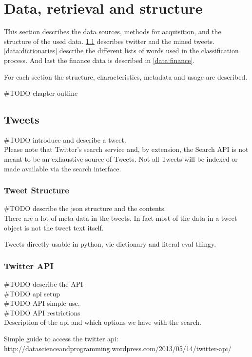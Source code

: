 \chapter{Data, retrieval and structure}

This section describes the data sources, methods for acquisition, and the
structure of the used data. \ref{data:tweets} describes twitter and the mined
tweets. \ref{data:dictionaries} describe the different lists of words used in
the classification process. And last the finance data is described in
\ref{data:finance}.

For each section the structure, characteristics, metadata and usage are
described. 

#TODO chapter outline
%

\section{Tweets}\label{data:tweets}
#TODO introduce and describe a tweet. \\
Please note that Twitter's search service and, by extension, the Search API is
not meant to be an exhaustive source of Tweets. Not all Tweets will be indexed
or made available via the search interface. 
%

\subsection{Tweet Structure}
#TODO describe the json structure and the contents.\\
There are a lot of meta data in the tweets. In fact most of the data in a tweet
object is not the tweet text itself.

Tweets directly usable in python, vie dictionary and literal eval thingy. 
%

\subsection{Twitter API}
#TODO describe the API\\
#TODO api setup\\
#TODO API simple use.\\
#TODO API restrictions\\

Description of the api and which options we have with the search. 

Simple guide to access the twitter api:  http://datascienceandprogramming.wordpress.com/2013/05/14/twitter-api/

